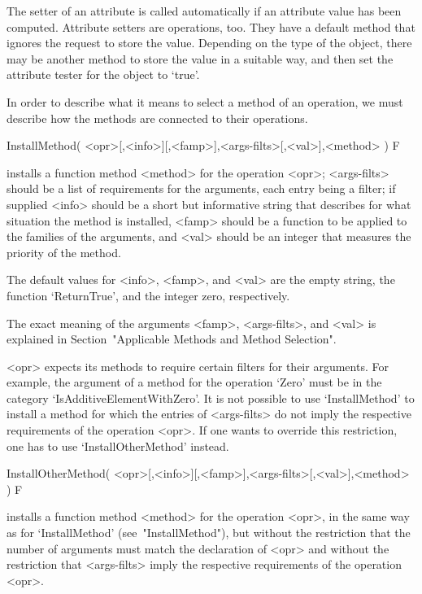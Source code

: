 The setter of an attribute is called automatically
if an attribute value has been computed.
Attribute setters are operations, too.
They have a default method that ignores the request to store the value.
Depending on the type of the object,
there may be another method to store the value in a suitable way,
and then set the attribute tester for the object to `true'.



In order to describe what it means to select a method of an operation,
we must describe how the methods are connected to their operations.

\>InstallMethod( <opr>[,<info>][,<famp>],<args-filts>[,<val>],<method> ) F

installs a function method <method> for the operation <opr>; 
<args-filts> should be a list of requirements for the arguments,
each entry being a filter;
if supplied <info> should be a short but informative string that describes 
for what situation the method is installed,
<famp> should be a function to be applied to the families of the arguments,
and <val> should be an integer that measures the priority of the method.

The default values for <info>, <famp>, and <val> are the empty string,
the function `ReturnTrue', and the integer zero, respectively.

The exact meaning of the arguments <famp>, <args-filts>,
and <val> is explained in Section~"Applicable Methods and Method Selection".

<opr> expects its methods to require certain filters for their arguments.
For example, the argument of a method for the operation `Zero' must be
in the category `IsAdditiveElementWithZero'.
It is not possible to use `InstallMethod' to install a method for which
the entries of <args-filts> do not imply the respective requirements of
the operation <opr>.
If one wants to override this restriction,
one has to use `InstallOtherMethod' instead.

\>InstallOtherMethod( <opr>[,<info>][,<famp>],<args-filts>[,<val>],<method> ) F

installs a function method <method> for the operation <opr>, in the same
way as for `InstallMethod' (see~"InstallMethod"), but without the restriction
that the number of arguments must match the declaration of <opr> and without
the restriction that <args-filts> imply the respective requirements of
the operation <opr>.

